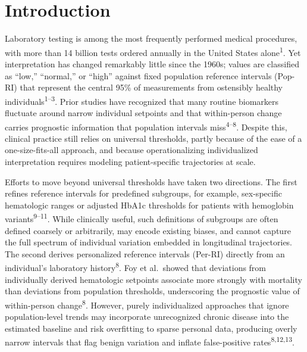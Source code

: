 \documentclass[11pt]{article}
\begin{document}
\section*{Introduction}

Laboratory testing is among the most frequently performed medical procedures, with more than 14 billion tests ordered annually in the United States alone\textsuperscript{1}. Yet interpretation has changed remarkably little since the 1960s; values are classified as ``low,'' ``normal,'' or ``high'' against fixed population reference intervals (Pop-RI) that represent the central 95\% of measurements from ostensibly healthy individuals\textsuperscript{1--3}. Prior studies have recognized that many routine biomarkers fluctuate around narrow individual setpoints and that within-person change carries prognostic information that population intervals miss\textsuperscript{4--8}. Despite this, clinical practice still relies on universal thresholds, partly because of the ease of a one-size-fits-all approach, and because operationalizing individualized interpretation requires modeling patient-specific trajectories at scale.

Efforts to move beyond universal thresholds have taken two directions. The first refines reference intervals for predefined subgroups, for example, sex-specific hematologic ranges or adjusted HbA1c thresholds for patients with hemoglobin variants\textsuperscript{9--11}. While clinically useful, such definitions of subgroups are often defined coarsely or arbitrarily, may encode existing biases, and cannot capture the full spectrum of individual variation embedded in longitudinal trajectories. The second derives personalized reference intervals (Per-RI) directly from an individual's laboratory history\textsuperscript{8}. Foy et al.\ showed that deviations from individually derived hematologic setpoints associate more strongly with mortality than deviations from population thresholds, underscoring the prognostic value of within-person change\textsuperscript{8}. However, purely individualized approaches that ignore population-level trends may incorporate unrecognized chronic disease into the estimated baseline and risk overfitting to sparse personal data, producing overly narrow intervals that flag benign variation and inflate false-positive rates\textsuperscript{8,12,13}.
\end{document}
